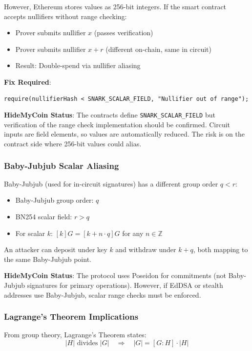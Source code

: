 \documentclass[11pt,a4paper]{article}
\begin{document}
However, Ethereum stores values as 256-bit integers. If the smart contract accepts nullifiers without range checking:
\begin{itemize}
    \item Prover submits nullifier $x$ (passes verification)
    \item Prover submits nullifier $x + r$ (different on-chain, same in circuit)
    \item Result: Double-spend via nullifier aliasing
\end{itemize}

\textbf{Fix Required}:
\begin{lstlisting}[style=solidity]
require(nullifierHash < SNARK_SCALAR_FIELD, "Nullifier out of range");
\end{lstlisting}

\textbf{HideMyCoin Status}: The contracts define \texttt{SNARK\_SCALAR\_FIELD} but verification of the range check implementation should be confirmed. Circuit inputs are field elements, so values are automatically reduced. The risk is on the contract side where 256-bit values could alias.

\subsubsection{Baby-Jubjub Scalar Aliasing}

Baby-Jubjub (used for in-circuit signatures) has a different group order $q < r$:
\begin{itemize}
    \item Baby-Jubjub group order: $q$
    \item BN254 scalar field: $r > q$
    \item For scalar $k$: $[k]G = [k + n \cdot q]G$ for any $n \in \mathbb{Z}$
\end{itemize}

An attacker can deposit under key $k$ and withdraw under $k + q$, both mapping to the same Baby-Jubjub point.

\textbf{HideMyCoin Status}: The protocol uses Poseidon for commitments (not Baby-Jubjub signatures for primary operations). However, if EdDSA or stealth addresses use Baby-Jubjub, scalar range checks must be enforced.

\subsubsection{Lagrange's Theorem Implications}

From group theory, Lagrange's Theorem states:
\begin{equation}
|H| \text{ divides } |G| \quad \Rightarrow \quad |G| = [G:H] \cdot |H|
\end{equation}
\end{document}
